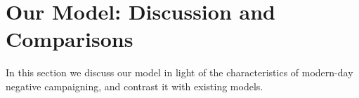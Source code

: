 \documentclass[letterpaper]{article} %
\newtheorem{theorem}{Theorem}
\newtheorem{lemma}{Lemma}
\newcommand{\CMCF}{\emph{minimal cost flow}}
\newcommand{\swapB}{\textsc{Swap Bribery}}
\begin{document}



\section{Our Model: Discussion and Comparisons}\label{sec:SB}
In this section we discuss our model in light of the characteristics of modern-day negative campaigning, and contrast it with existing models.
\end{document}
